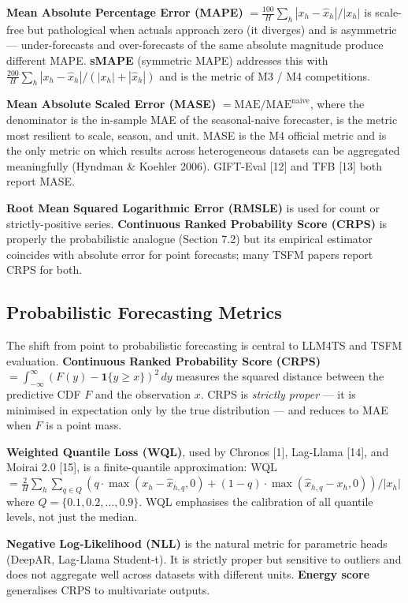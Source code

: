 \documentclass{article}
\begin{document}
\textbf{Mean Absolute Percentage Error (MAPE)} \(= \frac{100}{H} \sum_h |x_h - \hat{x}_h| / |x_h|\) is scale-free but pathological when actuals approach zero (it diverges) and is asymmetric --- under-forecasts and over-forecasts of the same absolute magnitude produce different MAPE. \textbf{sMAPE} (symmetric MAPE) addresses this with \(\frac{200}{H}\sum_h |x_h - \hat{x}_h|/(|x_h|+|\hat{x}_h|)\) and is the metric of M3 / M4 competitions.

\textbf{Mean Absolute Scaled Error (MASE)} \(= \mathrm{MAE} / \mathrm{MAE}^{\mathrm{naive}}\), where the denominator is the in-sample MAE of the seasonal-naive forecaster, is the metric most resilient to scale, season, and unit. MASE is the M4 official metric and is the only metric on which results across heterogeneous datasets can be aggregated meaningfully (Hyndman \& Koehler 2006). GIFT-Eval {[}12{]} and TFB {[}13{]} both report MASE.

\textbf{Root Mean Squared Logarithmic Error (RMSLE)} is used for count or strictly-positive series. \textbf{Continuous Ranked Probability Score (CRPS)} is properly the probabilistic analogue (Section 7.2) but its empirical estimator coincides with absolute error for point forecasts; many TSFM papers report CRPS for both.

\subsection{Probabilistic Forecasting Metrics}\label{probabilistic-forecasting-metrics}

The shift from point to probabilistic forecasting is central to LLM4TS and TSFM evaluation. \textbf{Continuous Ranked Probability Score (CRPS)} \(= \int_{-\infty}^{\infty} (F(y) - \mathbf{1}\{y \geq x\})^2\, dy\) measures the squared distance between the predictive CDF \(F\) and the observation \(x\). CRPS is \emph{strictly proper} --- it is minimised in expectation only by the true distribution --- and reduces to MAE when \(F\) is a point mass.

\textbf{Weighted Quantile Loss (WQL)}, used by Chronos {[}1{]}, Lag-Llama {[}14{]}, and Moirai 2.0 {[}15{]}, is a finite-quantile approximation: WQL \(= \frac{2}{H} \sum_h \sum_{q \in Q} (q \cdot \max(x_h - \hat{x}_{h,q}, 0) + (1-q)\cdot \max(\hat{x}_{h,q} - x_h, 0)) / |x_h|\) where \(Q = \{0.1, 0.2, \ldots, 0.9\}\). WQL emphasises the calibration of all quantile levels, not just the median.

\textbf{Negative Log-Likelihood (NLL)} is the natural metric for parametric heads (DeepAR, Lag-Llama Student-t). It is strictly proper but sensitive to outliers and does not aggregate well across datasets with different units. \textbf{Energy score} generalises CRPS to multivariate outputs.
\end{document}
